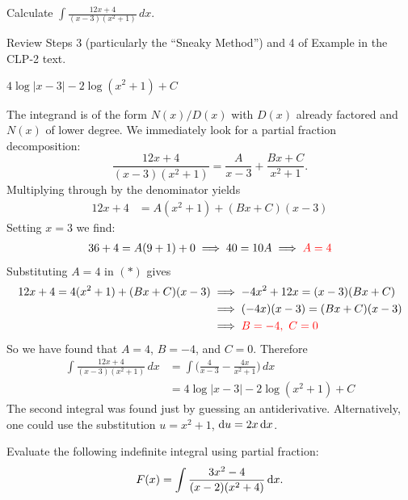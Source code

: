 \begin{Mquestion}[2016A]
Calculate $\displaystyle \int \frac{12x+4}{(x-3)(x^2+1)}\,dx$.
\end{Mquestion}

\begin{hint}
Review Steps 3 (particularly the ``Sneaky Method'') and 4 of
Example  in the CLP-2 text.
\end{hint}

\begin{answer}
$4 \log |x-3| - 2 \log (x^2 + 1) + C$
\end{answer}

\begin{solution}
The integrand is of the form $N(x)/D(x)$ with $D(x)$ already factored
and $N(x)$ of lower degree. We immediately look for a partial fraction decomposition:
\begin{equation*}
\frac{12x+4}{(x-3)(x^2+1)} = \frac{A}{x-3} + \frac{Bx+C}{x^2+1}.
\end{equation*}
Multiplying through by the denominator yields
\begin{align}
12x+4 &= A(x^2+1) + (Bx+C)(x-3)
\tag{$*$}
\end{align}
Setting $x=3$ we find:
\begin{align*}
   36 +4 = A(9 + 1) + 0 \implies 40 =10A  \implies \color{red}A = 4
\end{align*}
Substituting $A=4$ in $(*)$ gives
\begin{align*}
12x+4 = 4(x^2+1) + (Bx+C)(x-3)
  &\implies   -4x^2+12 x =(x-3)(Bx + C) \\
  &\implies   (-4x)(x-3)=(Bx + C)(x-3) \\
  & \implies  \color{red}B=-4,~C=0
\end{align*}
So we have found that $A=4$, $B=-4$, and $C=0$. Therefore
\begin{align*}
  \int \frac{12x+4}{(x-3)(x^2+1)} \,dx &= \int \bigg( \frac{4}{x-3} - \frac{4x}{x^2+1} \bigg) \,dx \\
   &=  4 \log |x-3| - 2 \log (x^2 + 1) + C
\end{align*}
The second integral was found just by guessing an antiderivative.
Alternatively, one could use the substitution $u=x^2+1$, $\mathrm{d}u=2x\,\mathrm{d}x$.
\end{solution}


\begin{question}[2016Q4]
Evaluate the following indefinite integral using partial fraction:
\begin{align*}
F(x) = \int \frac{3x^2 -4}{(x-2)(x^2+4)}\,\mathrm{d}x .
\end{align*}
\end{question}

